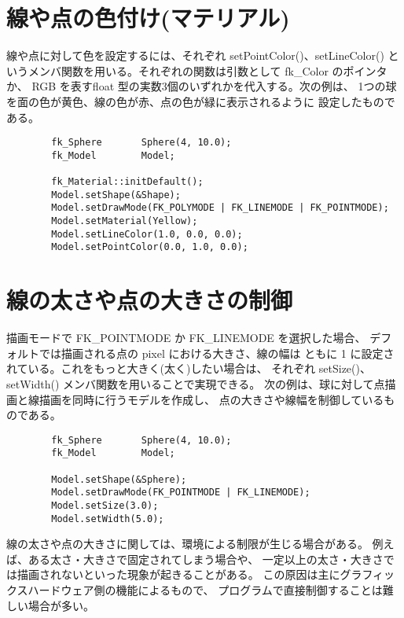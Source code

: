 \section{線や点の色付け(マテリアル)} \label{sec:pointlinemat}
線や点に対して色を設定するには、それぞれ setPointColor()、setLineColor()
というメンバ関数を用いる。それぞれの関数は引数として fk\_Color のポインタか、
RGB を表すfloat 型の実数3個のいずれかを代入する。次の例は、
1つの球を面の色が黄色、線の色が赤、点の色が緑に表示されるように
設定したものである。
\\
\begin{breakbox}
\begin{verbatim}
        fk_Sphere       Sphere(4, 10.0);
        fk_Model        Model;

        fk_Material::initDefault();
        Model.setShape(&Shape);
        Model.setDrawMode(FK_POLYMODE | FK_LINEMODE | FK_POINTMODE);
        Model.setMaterial(Yellow);     
        Model.setLineColor(1.0, 0.0, 0.0);
        Model.setPointColor(0.0, 1.0, 0.0);
\end{verbatim}
\end{breakbox}

\section{線の太さや点の大きさの制御} \label{subsec:widthsize}
描画モードで FK\_POINTMODE か FK\_LINEMODE を選択した場合、
デフォルトでは描画される点の pixel における大きさ、線の幅は
ともに 1 に設定されている。これをもっと大きく(太く)したい場合は、
それぞれ setSize()、setWidth() メンバ関数を用いることで実現できる。
次の例は、球に対して点描画と線描画を同時に行うモデルを作成し、
点の大きさや線幅を制御しているものである。
\\
\begin{breakbox}
\begin{verbatim}
        fk_Sphere       Sphere(4, 10.0);
        fk_Model        Model;

        Model.setShape(&Sphere);
        Model.setDrawMode(FK_POINTMODE | FK_LINEMODE);
        Model.setSize(3.0);
        Model.setWidth(5.0);
\end{verbatim}
\end{breakbox}

線の太さや点の大きさに関しては、環境による制限が生じる場合がある。
例えば、ある太さ・大きさで固定されてしまう場合や、
一定以上の太さ・大きさでは描画されないといった現象が起きることがある。
この原因は主にグラフィックスハードウェア側の機能によるもので、
プログラムで直接制御することは難しい場合が多い。


